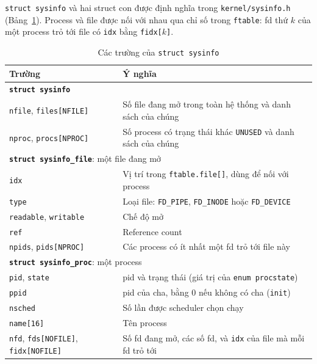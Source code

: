 \texttt{struct sysinfo} và hai struct con được định nghĩa trong \texttt{kernel/sysinfo.h} (Bảng~\ref{tab:sysinfo}). Process và file được nối với nhau qua chỉ số trong \texttt{ftable}: fd thứ $k$ của một process trỏ tới file có \texttt{idx} bằng \texttt{fidx[}$k$\texttt{]}.

\begin{table}[tbp]
\centering
\begin{tabularx}{\textwidth}{|l|>{\raggedright\arraybackslash}X|}
\hline
\textbf{Trường} & \textbf{Ý nghĩa} \\ \hline
\multicolumn{2}{|l|}{\textbf{\texttt{struct sysinfo}}} \\ \hline
\texttt{nfile}, \texttt{files[NFILE]} & Số file đang mở trong toàn hệ thống và danh sách của chúng \\ \hline
\texttt{nproc}, \texttt{procs[NPROC]} & Số process có trạng thái khác \texttt{UNUSED} và danh sách của chúng \\ \hline
\multicolumn{2}{|l|}{\textbf{\texttt{struct sysinfo\_file}}: một file đang mở} \\ \hline
\texttt{idx} & Vị trí trong \texttt{ftable.file[]}, dùng để nối với process \\ \hline
\texttt{type} & Loại file: \texttt{FD\_PIPE}, \texttt{FD\_INODE} hoặc \texttt{FD\_DEVICE} \\ \hline
\texttt{readable}, \texttt{writable} & Chế độ mở \\ \hline
\texttt{ref} & Reference count \\ \hline
\texttt{npids}, \texttt{pids[NPROC]} & Các process có ít nhất một fd trỏ tới file này \\ \hline
\multicolumn{2}{|l|}{\textbf{\texttt{struct sysinfo\_proc}}: một process} \\ \hline
\texttt{pid}, \texttt{state} & pid và trạng thái (giá trị của \texttt{enum procstate}) \\ \hline
\texttt{ppid} & pid của cha, bằng 0 nếu không có cha (\texttt{init}) \\ \hline
\texttt{nsched} & Số lần được scheduler chọn chạy \\ \hline
\texttt{name[16]} & Tên process \\ \hline
\texttt{nfd}, \texttt{fds[NOFILE]}, \texttt{fidx[NOFILE]} & Số fd đang mở, các số fd, và \texttt{idx} của file mà mỗi fd trỏ tới \\ \hline
\end{tabularx}
\caption{Các trường của \texttt{struct sysinfo}}
\label{tab:sysinfo}
\end{table}


